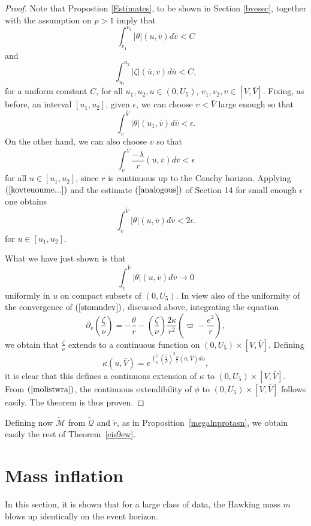 \documentclass{article}
\newcommand{\zn}{\frac{\zeta}{\nu}}
\begin{document}
{\begin{proof}
Note that Propostion \ref{Estimates}, to be shown in
Section \ref{bvesec}, together with the assumption on
$p>1$ imply that 
\[
\int_{v_1}^{v_2}{|\theta|(u,\bar{v})d\bar{v}}<C
\]
and
\begin{equation}
\label{kovteuoume...}
\int_{u_1}^{u_2}{|\zeta|(\bar{u},v)d\bar{u}}<C,
\end{equation}
for a uniform constant $C$, for all $u_1,u_2,u\in(0,U_5)$,
$v_1,v_2,v\in[V,\bar{V}]$.
Fixing, as before, an interval $[u_1,u_2]$, given $\epsilon$,
we can choose
$v<\bar{V}$ large enough so that
\[
\int_{v}^{\bar{V}}{|\theta|(u_1,\bar{v})d\bar{v}}<\epsilon.
\]
On the other hand, we can also choose $v$ so that
\[
\int_{v}^{\bar{V}}{\frac{-\lambda}{r}(u,\bar{v})d\bar{v}}<\epsilon
\]
for all $u\in[u_1,u_2]$, since $r$ is continuous up to the
Cauchy horizon.
Applying $(\ref{kovteuoume...})$ and the
estimate $(\ref{analogous})$ of Section 14 for
small enough $\epsilon$ one obtains 
\[
\int_{v}^{\bar{V}}{|\theta|(u,\bar{v})d\bar{v}}<2\epsilon.
\]
for $u\in[u_1,u_2]$.
 
What we have just shown is that
\begin{equation}
\label{molistwra}
\int_{v}^{\bar{V}}{|\theta|(u,\bar{v})d\bar{v}}\to0
\end{equation}
uniformly in $u$ on compact subsets of $(0,U_5)$.
In view also of the uniformity of the convergence
of $(\ref{stomndev})$, discussed above, integrating the equation
\[
\partial_v\left(\zn\right)=
-\frac\theta{r}-\left(\zn\right)
\frac{2\kappa}{r^2}\left(\varpi-\frac{e^2}r\right),
\]
we obtain that
$\zn$ extends to a continuous function on
$(0,U_5)\times[V,\bar{V}]$.
Defining 
\[
\kappa(u,\bar{V})=e^{\int_u^U
{\left(\zn\right)^2\frac\nu{r}(u,\bar{V})du}},
\]
it is clear that this defines a continuous extension of
$\kappa$ to $(0,U_5)\times[V,\bar{V}]$.
From $(\ref{molistwra})$, the continuous extendibility
of $\phi$ to $(0, U_5)\times[V,\bar{V}]$ follows easily.
The theorem is thus proven.
\end{proof}

Defining now $\tilde{\mathcal{M}}$ from $\tilde{\mathcal{Q}}$
and $\tilde{r}$, as in Proposition~\ref{megalnprotasn},
we obtain easily the rest of Theorem~\ref{eis9ew}.

\section{Mass inflation}
\label{minsec}

In this section, it is shown that for  a large
class of data, the Hawking mass $m$ blows up
identically on the event horizon.

}
\end{document}
